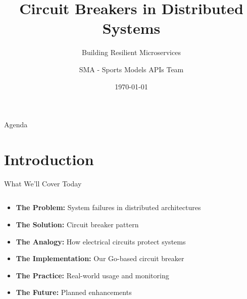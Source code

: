 \documentclass[aspectratio=169]{beamer}
\title[Circuit Breakers]{Circuit Breakers in Distributed Systems}
\subtitle{Building Resilient Microservices}
\author{SMA - Sports Models APIs Team}
\institute{Genius Sports}
\date{\today}
\begin{document}
\begin{frame}
    \titlepage
\end{frame}

\begin{frame}{Agenda}
    \tableofcontents
\end{frame}

\section{Introduction}

\begin{frame}{What We'll Cover Today}
    \begin{columns}
        \begin{column}{0.5\textwidth}
            \begin{itemize}
                \item \textbf{The Problem:} System failures in distributed architectures
                \item \textbf{The Solution:} Circuit breaker pattern
                \item \textbf{The Analogy:} How electrical circuits protect systems
                \item \textbf{The Implementation:} Our Go-based circuit breaker
                \item \textbf{The Practice:} Real-world usage and monitoring
                \item \textbf{The Future:} Planned enhancements
            \end{itemize}
        \end{column}
        \begin{column}{0.5\textwidth}
            \begin{center}
            \end{center}
        \end{column}
    \end{columns}
\end{frame}
\end{document}
